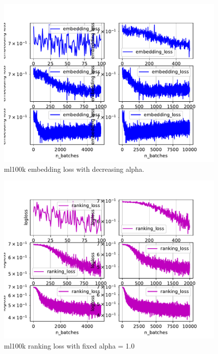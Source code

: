 \documentclass{article}
\begin{document}
\begin{figure}[t!]
\begin{center}
\includegraphics[width=1\textwidth]{figures/ml100k/embedding_loss_dec_alpha.pdf}  
\end{center}
\caption{ml100k embedding loss with decreasing alpha.}
\label{fig:ProperCover}
\end{figure}

\begin{figure}[t!]
\begin{center}
\includegraphics[width=1\textwidth]{figures/ml100k/ranking_loss_multipleplots.pdf}  
\end{center}
\caption{ml100k ranking loss with fixed alpha = 1.0}
\label{fig:ProperCover}
\end{figure}
\end{document}
